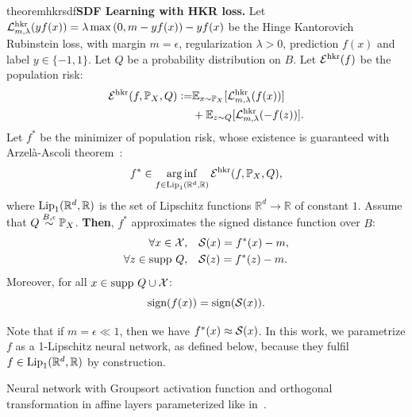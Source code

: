 \begin{restatable}{theorem}{hkrsdf}{\normalfont\textbf{SDF Learning with HKR loss.}} Let $\mathcal{L}^{\text{hkr}}_{m,\lambda}(yf(x))=\lambda\max{(0, m-yf(x))}-yf(x)$ be the Hinge Kantorovich Rubinstein loss, with margin $m=\epsilon$, regularization $\lambda>0$, prediction $f(x)$ and label $y\in\{-1,1\}$. Let $Q$ be a probability distribution on $B$. Let $\mathcal{E}^{\text{hkr}}(f)$ be the population risk:
\begin{equation}
\begin{aligned}
    \mathcal{E}^{\text{hkr}}(f,\mathbb{P}_X,Q)\vcentcolon=&\mathbb{E}_{x\sim\mathbb{P}_X}[\mathcal{L}^{\text{hkr}}_{m,\lambda}(f(x))]\\
    &+\mathbb{E}_{z\sim Q}[\mathcal{L}^{\text{hkr}}_{m,\lambda}(-f(z))].
\end{aligned}
\end{equation}
Let $f^{*}$ be the minimizer of population risk, whose existence is guaranteed with Arzel\`a-Ascoli theorem~\cite{bethune2022pay}:
\begin{equation}\label{eq:empiricalminimizer}
    f^{*}\in\operatorname*{arg\,inf}_{f\in\text{Lip}_1(\mathbb{R}^d,\mathbb{R})}\mathcal{E}^{\text{hkr}}(f,\mathbb{P}_X,Q),
\end{equation}
where $\text{Lip}_1(\mathbb{R}^d,\mathbb{R})$ is the set of Lipschitz functions $\mathbb{R}^d \rightarrow \mathbb{R}$ of constant $1$. Assume that $Q\stackrel{B,\epsilon}{\sim}\mathbb{P}_X$. \textbf{Then}, $f^{*}$ approximates the signed distance function over $B$:
\begin{equation}
    \begin{aligned}
        \forall x\in \mathcal{X},\quad&\mathcal{S}(x)= f^{*}(x)-m,\\
        \forall z\in\text{supp }Q,\quad&\mathcal{S}(z)= f^{*}(z)-m.
    \end{aligned}
\end{equation}\label{thm:hkrsdf}
Moreover, for all $x\in\text{supp }Q\cup \mathcal{X}$:
$$\text{sign}(f(x))=\text{sign}(\mathcal{S}(x)).$$  
\end{restatable}

Note that if $m=\epsilon\ll 1$, then we have $f^{*}(x)\approx \mathcal{S}(x)$. In this work, we parametrize $f$ as a 1-Lipschitz neural network, as defined below, because they fulfil $f\in\text{Lip}_1(\mathbb{R}^d,\mathbb{R})$ by construction.

\begin{definition}
Neural network with Groupsort activation function and orthogonal transformation in affine layers parameterized like in~\cite{anil2019sorting}.
\end{definition}

